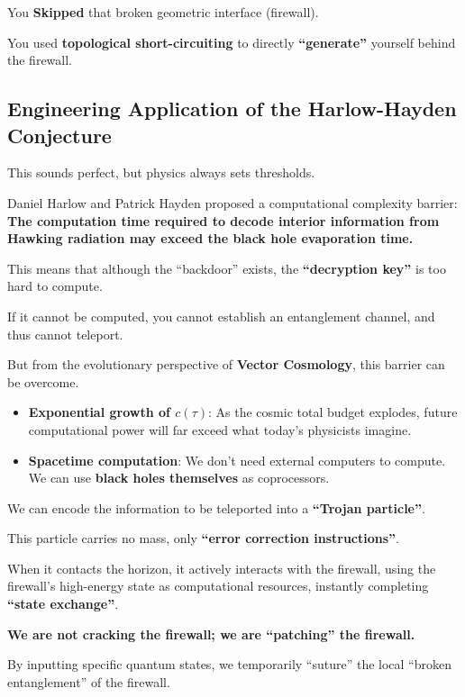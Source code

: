 You \textbf{Skipped} that broken geometric interface (firewall).

You used \textbf{topological short-circuiting} to directly \textbf{``generate''} yourself behind the firewall.

\subsection{Engineering Application of the Harlow-Hayden Conjecture}

This sounds perfect, but physics always sets thresholds.

Daniel Harlow and Patrick Hayden proposed a computational complexity barrier: \textbf{The computation time required to decode interior information from Hawking radiation may exceed the black hole evaporation time.}

This means that although the ``backdoor'' exists, the \textbf{``decryption key''} is too hard to compute.

If it cannot be computed, you cannot establish an entanglement channel, and thus cannot teleport.

But from the evolutionary perspective of \textbf{Vector Cosmology}, this barrier can be overcome.

\begin{itemize}
\item \textbf{Exponential growth of $c(\tau)$}: As the cosmic total budget explodes, future computational power will far exceed what today's physicists imagine.

\item \textbf{Spacetime computation}: We don't need external computers to compute. We can use \textbf{black holes themselves} as coprocessors.
\end{itemize}

We can encode the information to be teleported into a \textbf{``Trojan particle''}.

This particle carries no mass, only \textbf{``error correction instructions''}.

When it contacts the horizon, it actively interacts with the firewall, using the firewall's high-energy state as computational resources, instantly completing \textbf{``state exchange''}.

\textbf{We are not cracking the firewall; we are ``patching'' the firewall.}

By inputting specific quantum states, we temporarily ``suture'' the local ``broken entanglement'' of the firewall.

